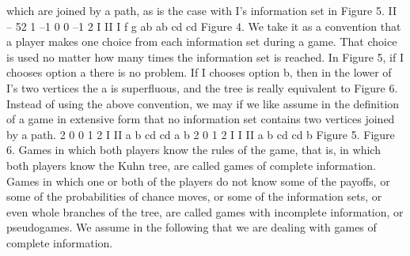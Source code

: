 \begin{framed}
which are joined by a path, as is the case with I’s information set in Figure 5.
II – 52
1
–1 0 0 –1
2
I
II
I
f g
ab ab
cd cd
Figure 4.
We take it as a convention that a player makes one choice from each information set
during a game. That choice is used no matter how many times the information set is
reached. In Figure 5, if I chooses option a there is no problem. If I chooses option b, then
in the lower of I’s two vertices the a is superfluous, and the tree is really equivalent to
Figure 6. Instead of using the above convention, we may if we like assume in the definition
of a game in extensive form that no information set contains two vertices joined by a path.
2 0
0 1
2
I
II
a b
cd cd
a b
2 0
1
2
I
I
II
a b
cd cd
b
Figure 5. Figure 6.
Games in which both players know the rules of the game, that is, in which both players
know the Kuhn tree, are called games of complete information. Games in which one or
both of the players do not know some of the payoffs, or some of the probabilities of chance
moves, or some of the information sets, or even whole branches of the tree, are called
games with incomplete information, or pseudogames. We assume in the following
that we are dealing with games of complete information.

\end{framed}
